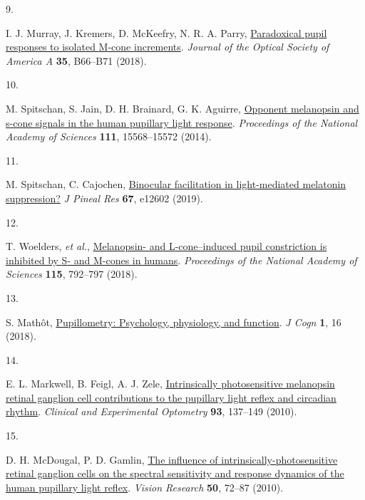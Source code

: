 \documentclass[
]{article}
\newlength{\cslhangindent}
\newlength{\csllabelwidth}
\newlength{\cslentryspacingunit} %
\newenvironment{CSLReferences}[2] %
 {%
  \setlength{\parindent}{0pt}
  \ifodd #1
  \let\oldpar\par
  \def\par{\hangindent=\cslhangindent\oldpar}
  \fi
  \setlength{\parskip}{#2\cslentryspacingunit}
 }%
 {}
\newcommand{\CSLLeftMargin}[1]{\parbox[t]{\csllabelwidth}{#1}}
\newcommand{\CSLRightInline}[1]{\parbox[t]{\linewidth - \csllabelwidth}{#1}\break}
\begin{document}
\begin{CSLReferences}{0}{0}
\leavevmode{}%
\CSLLeftMargin{9. }%
\CSLRightInline{I. J. Murray, J. Kremers, D. McKeefry, N. R. A. Parry, \href{https://doi.org/10.1364/JOSAA.35.000B66}{Paradoxical pupil responses to isolated {M}-cone increments}. \emph{Journal of the Optical Society of America A} \textbf{35}, B66--B71 (2018).}

\leavevmode{}%
\CSLLeftMargin{10. }%
\CSLRightInline{M. Spitschan, S. Jain, D. H. Brainard, G. K. Aguirre, \href{https://doi.org/10.1073/pnas.1400942111}{Opponent melanopsin and s-cone signals in the human pupillary light response}. \emph{Proceedings of the National Academy of Sciences} \textbf{111}, 15568--15572 (2014).}

\leavevmode{}%
\CSLLeftMargin{11. }%
\CSLRightInline{M. Spitschan, C. Cajochen, \href{https://doi.org/10.1111/jpi.12602}{Binocular facilitation in light-mediated melatonin suppression?} \emph{J Pineal Res} \textbf{67}, e12602 (2019).}

\leavevmode{}%
\CSLLeftMargin{12. }%
\CSLRightInline{T. Woelders, \emph{et al.}, \href{https://doi.org/10.1073/pnas.1716281115}{Melanopsin- and {L}-cone--induced pupil constriction is inhibited by {S}- and {M}-cones in humans}. \emph{Proceedings of the National Academy of Sciences} \textbf{115}, 792--797 (2018).}

\leavevmode{}%
\CSLLeftMargin{13. }%
\CSLRightInline{S. Mathôt, \href{https://doi.org/10.5334/joc.18}{Pupillometry: Psychology, physiology, and function}. \emph{J Cogn} \textbf{1}, 16 (2018).}

\leavevmode{}%
\CSLLeftMargin{14. }%
\CSLRightInline{E. L. Markwell, B. Feigl, A. J. Zele, \href{https://doi.org/10.1111/j.1444-0938.2010.00479.x}{Intrinsically photosensitive melanopsin retinal ganglion cell contributions to the pupillary light reflex and circadian rhythm}. \emph{Clinical and Experimental Optometry} \textbf{93}, 137--149 (2010).}

\leavevmode{}%
\CSLLeftMargin{15. }%
\CSLRightInline{D. H. McDougal, P. D. Gamlin, \href{https://doi.org/10.1016/j.visres.2009.10.012}{The influence of intrinsically-photosensitive retinal ganglion cells on the spectral sensitivity and response dynamics of the human pupillary light reflex}. \emph{Vision Research} \textbf{50}, 72--87 (2010).}


\end{CSLReferences}
\end{document}
